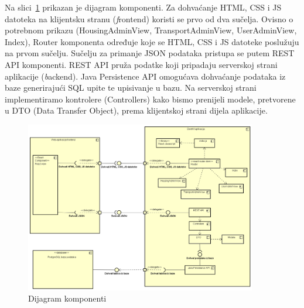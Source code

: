 			Na slici~\ref{fig:DijagramKomponenti} prikazan je dijagram komponenti. Za dohvaćanje HTML, CSS i JS datoteka na klijentsku stranu (\textit frontend) koristi se prvo od dva sučelja. Ovisno o potrebnom prikazu (HousingAdminView, TransportAdminView, UserAdminView, Index), Router komponenta određuje koje se HTML, CSS i JS datoteke poslužuju na prvom sučelju. Sučelju za primanje JSON podataka pristupa se putem REST API komponenti. REST API pruža podatke koji pripadaju serverskoj strani aplikacije (\textit backend). Java Persistence API omogućava dohvaćanje podataka iz baze generirajući SQL upite te upisivanje u bazu. Na serverskoj strani implementiramo kontrolere (Controllers) kako bismo prenijeli modele, pretvorene u DTO (Data Transfer Object), prema klijentskoj strani dijela aplikacije.
			 \begin{figure}[htbp]
			 	\centering
			 	\includegraphics[width=0.9\textwidth]{dijagrami/DijagramKomponenti.png}
			 	\caption{Dijagram komponenti}
			 	\label{fig:DijagramKomponenti}
			 \end{figure}